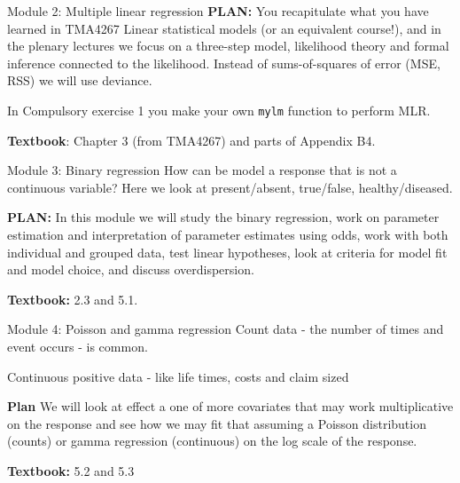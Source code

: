 \documentclass[
  ignorenonframetext,
]{beamer}
\begin{document}
\begin{frame}[fragile]
\begin{block}{Module 2: Multiple linear regression}
\label{module-2-multiple-linear-regression}
\textbf{PLAN:} You recapitulate what you have learned in TMA4267 Linear
statistical models (or an equivalent course!), and in the plenary
lectures we focus on a three-step model, likelihood theory and formal
inference connected to the likelihood. Instead of sums-of-squares of
error (MSE, RSS) we will use deviance.

In Compulsory exercise 1 you make your own \texttt{mylm} function to
perform MLR.

\textbf{Textbook}: Chapter 3 (from TMA4267) and parts of Appendix B4.
\end{block}
\end{frame}

\begin{frame}
\begin{block}{Module 3: Binary regression}
\label{module-3-binary-regression}
How can be model a response that is not a continuous variable? Here we
look at present/absent, true/false, healthy/diseased.

\textbf{PLAN:} In this module we will study the binary regression, work
on parameter estimation and interpretation of parameter estimates using
odds, work with both individual and grouped data, test linear
hypotheses, look at criteria for model fit and model choice, and discuss
overdispersion.

\textbf{Textbook:} 2.3 and 5.1.
\end{block}
\end{frame}

\begin{frame}
\begin{block}{Module 4: Poisson and gamma regression}
\label{module-4-poisson-and-gamma-regression}
Count data - the number of times and event occurs - is common.

Continuous positive data - like life times, costs and claim sized

\textbf{Plan} We will look at effect a one of more covariates that may
work multiplicative on the response and see how we may fit that assuming
a Poisson distribution (counts) or gamma regression (continuous) on the
log scale of the response.

\textbf{Textbook:} 5.2 and 5.3
\end{block}
\end{frame}
\end{document}
